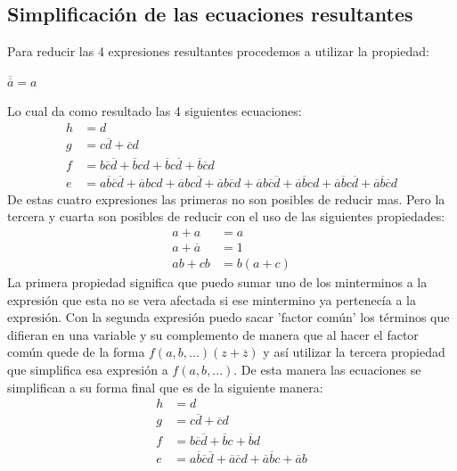 \documentclass{article}
\begin{document}
	\subsection{Simplificación de las ecuaciones resultantes}
		\hspace{10mm} Para reducir las 4 expresiones resultantes procedemos a utilizar la propiedad:
		\newline \centerline{$\overline{\overline{a}}=a$}
		Lo cual da como resultado las 4 siguientes ecuaciones:
			\begin{align*}
				h & = d\\
				g & = c\overline{d}+\overline{c}d\\
				f & = b\overline{c}\overline{d}+\overline{b}cd+\overline{b}c\overline{d}+\overline{b}\overline{c}d\\
				e & = a\overline{b}\overline{c}\overline{d}+\overline{a}bcd+\overline{a}bc\overline{d}+\overline{a}b\overline{c}d+\overline{a}b\overline{c}\overline{d}+\overline{a}\overline{b}cd+\overline{a}\overline{b}c\overline{d}+\overline{a}\overline{b}\overline{c}d
			\end{align*}
			De estas cuatro expresiones las primeras no son posibles de reducir mas. Pero la tercera y cuarta son posibles de reducir con el uso de las siguientes propiedades:
			\begin{align*}
				a+a & = a\\
				a+\overline{a} & = 1\\
				ab+cb & = b(a+c)
			\end{align*} 
			La primera propiedad significa que puedo sumar uno de los minterminos a la expresión que esta no se vera afectada si ese mintermino ya pertenecía a la expresión. Con la segunda expresión puedo sacar 'factor común' los términos que difieran en una variable y su complemento de manera que al hacer el factor común quede de la forma $f(a,b,...)(z+\overline{z})$ y así utilizar la tercera propiedad que simplifica esa expresión a $f(a,b,...)$. De esta manera las ecuaciones se simplifican a su forma final que es de la siguiente manera:
			\begin{align*}
				h & = d\\
				g & = c\overline{d}+\overline{c}d\\
				f & = b\overline{c}\overline{d}+\overline{b}c+\overline{b}d\\
				e & = a\overline{b}\overline{c}\overline{d}+\overline{a}\overline{c}d+\overline{a}\overline{b}c+\overline{a}b
			\end{align*}
\end{document}
